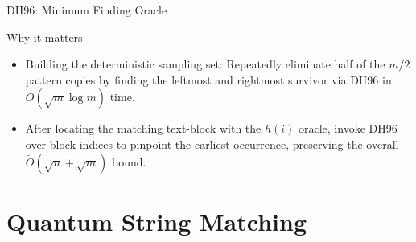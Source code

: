 \documentclass{beamer}
\begin{document}
\begin{frame}{DH96: Minimum Finding Oracle}

    \begin{block}{Why it matters}
        \begin{itemize}
            \item Building the deterministic sampling set:
                  Repeatedly eliminate half of the \(m/2\) pattern copies by finding
                  the leftmost and rightmost survivor via DH96 in \(O(\sqrt{m}\log m)\) time.
            \item After locating the matching text-block with the \(h(i)\) oracle,
                  invoke DH96 over block indices to pinpoint the earliest occurrence,
                  preserving the overall \(\tilde{O}(\sqrt{n} + \sqrt{m})\) bound.
        \end{itemize}
    \end{block}
\end{frame}

\section{Quantum String Matching}
\end{document}
